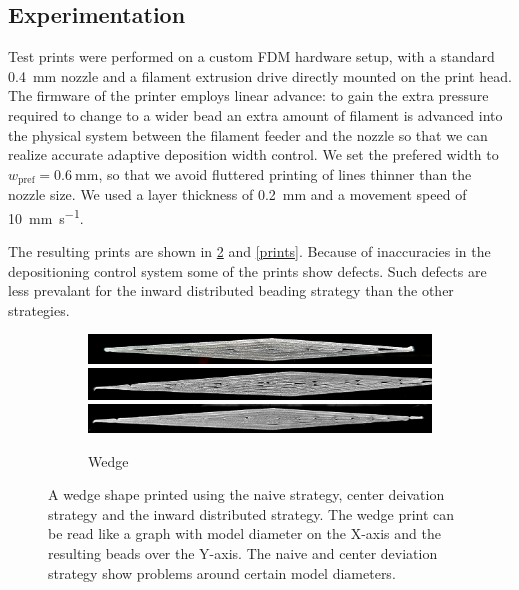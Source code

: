 \subsection{Experimentation}
Test prints were performed on a custom FDM hardware setup, with a standard \SI{0.4}{\milli\meter} nozzle and a filament extrusion drive directly mounted on the print head.
The firmware of the printer employs linear advance: to gain the extra pressure required to change to a wider bead an extra amount of filament is advanced into the physical system between the filament feeder and the nozzle so that we can realize accurate adaptive deposition width control.\cite{tronvoll2019investigating}
We set the prefered width to $w_\text{pref} = \SI{0.6}{\milli\meter}$, so that we avoid fluttered printing of lines thinner than the nozzle size.
We used a layer thickness of \SI{0.2}{\milli\meter} and a movement speed of \SI{10}{\milli\meter\per\second}.

The resulting prints are shown in \cref{wedge_print} and \cref{prints}.
Because of inaccuracies in the depositioning control system some of the prints show defects.
Such defects are less prevalant for the inward distributed beading strategy than the other strategies.


\begin{figure}
\centering
\begin{subfigure}{\columnwidth}\centering
\setlength{\figwidth}{\columnwidth}
\includegraphics[width=\figwidth]{sources/applications/P3_print_wedge_naive_edited.png}
\includegraphics[width=\figwidth]{sources/applications/P3_print_wedge_center_edited.png}
\includegraphics[width=\figwidth]{sources/applications/P3_print_wedge_inward_edited.png}
\caption{Wedge}\label{print_wedge}
\end{subfigure}
\caption{
A wedge shape printed using the naive strategy, center deivation strategy and the inward distributed strategy.
The wedge print can be read like a graph with model diameter on the X-axis and the resulting beads over the Y-axis.
The naive and center deviation strategy show problems around certain model diameters.
}
\label{wedge_print}
\end{figure}

